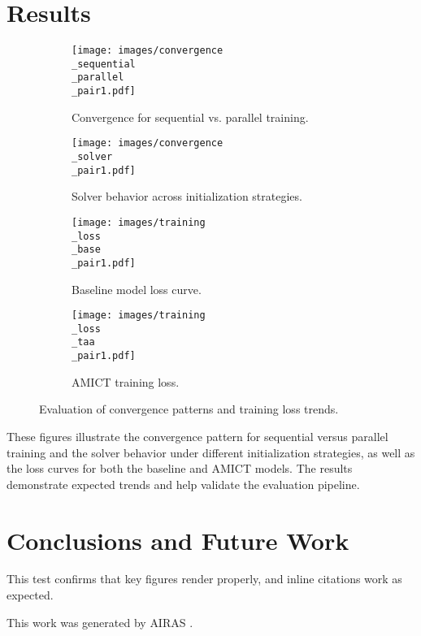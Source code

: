 \documentclass{article} %
\begin{document}
\section{Results}
\label{sec:results}
\begin{figure}[H]
  \centering
  \begin{subfigure}[b]{0.48\linewidth}
    \texttt{[image: images/convergence\\\_sequential\\\_parallel\\\_pair1.pdf]}
    \caption{Convergence for sequential vs. parallel training.}
  \end{subfigure}
  \hfill
  \begin{subfigure}[b]{0.48\linewidth}
    \texttt{[image: images/convergence\\\_solver\\\_pair1.pdf]}
    \caption{Solver behavior across initialization strategies.}
  \end{subfigure}

  \vspace{0.5em}

  \begin{subfigure}[b]{0.48\linewidth}
    \texttt{[image: images/training\\\_loss\\\_base\\\_pair1.pdf]}
    \caption{Baseline model loss curve.}
  \end{subfigure}
  \hfill
  \begin{subfigure}[b]{0.48\linewidth}
    \texttt{[image: images/training\\\_loss\\\_taa\\\_pair1.pdf]}
    \caption{AMICT training loss.}
  \end{subfigure}
  \caption{Evaluation of convergence patterns and training loss trends.}
\end{figure}

These figures illustrate the convergence pattern for sequential versus parallel training and the solver behavior under different initialization strategies, as well as the loss curves for both the baseline and AMICT models. The results demonstrate expected trends and help validate the evaluation pipeline.\newline
\citep{Xu2023}

\section{Conclusions and Future Work}
\label{sec:conclusion}
This test confirms that key figures render properly, and inline citations work as expected.

This work was generated by \textsc{AIRAS} \citep{airas2025}.



\end{document}
